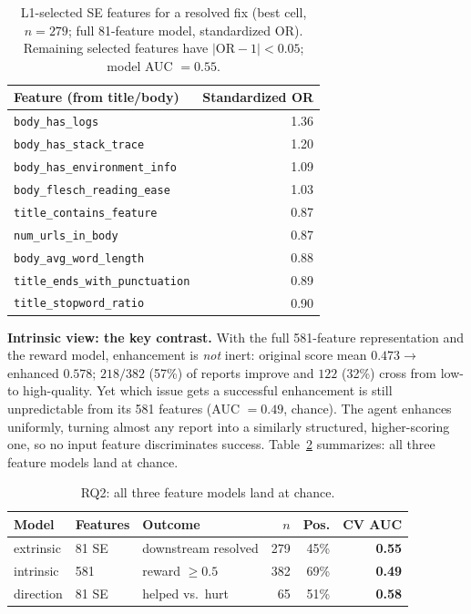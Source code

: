 \documentclass[journal]{IEEEtran}
\begin{document}
\begin{table}[t]
\centering
\caption{L1-selected SE features for a resolved fix (best cell, $n=279$; full 81-feature model, standardized OR). Remaining selected features have $|\text{OR}-1| < 0.05$; model AUC $=0.55$.}
\label{tab:l1}
\begin{tabular}{@{}lr@{}}
\toprule
Feature (from title/body) & Standardized OR \\
\midrule
\texttt{body\_has\_logs}              & 1.36 \\
\texttt{body\_has\_stack\_trace}      & 1.20 \\
\texttt{body\_has\_environment\_info} & 1.09 \\
\texttt{body\_flesch\_reading\_ease}  & 1.03 \\
\texttt{title\_contains\_feature}     & 0.87 \\
\texttt{num\_urls\_in\_body}          & 0.87 \\
\texttt{body\_avg\_word\_length}      & 0.88 \\
\texttt{title\_ends\_with\_punctuation} & 0.89 \\
\texttt{title\_stopword\_ratio}       & 0.90 \\
\bottomrule
\end{tabular}
\end{table}

\textbf{Intrinsic view: the key contrast.} With the full 581-feature representation and the reward model, enhancement is \emph{not} inert: original score mean $0.473 \rightarrow$ enhanced $0.578$; $218/382$ (57\%) of reports improve and $122$ (32\%) cross from low- to high-quality. Yet which issue gets a successful enhancement is still unpredictable from its 581 features (AUC $=0.49$, chance). The agent enhances uniformly, turning almost any report into a similarly structured, higher-scoring one, so no input feature discriminates success. Table~\ref{tab:models} summarizes: all three feature models land at chance.

\begin{table}[t]
\centering
\caption{RQ2: all three feature models land at chance.}
\label{tab:models}
\setlength{\tabcolsep}{4pt}
\begin{tabular}{@{}lllrrr@{}}
\toprule
Model & Features & Outcome & $n$ & Pos. & CV AUC \\
\midrule
extrinsic & 81 SE  & downstream resolved & 279 & 45\% & \textbf{0.55} \\
intrinsic & 581    & reward $\ge 0.5$    & 382 & 69\% & \textbf{0.49} \\
direction & 81 SE  & helped vs.\ hurt    & 65  & 51\% & \textbf{0.58} \\
\bottomrule
\end{tabular}
\end{table}
\end{document}
